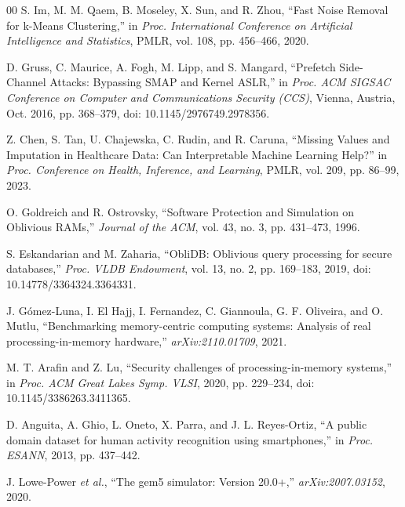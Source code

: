 \documentclass[conference]{IEEEtran}
\begin{document}
\begin{thebibliography}{00}
 S. Im, M. M. Qaem, B. Moseley, X. Sun, and R. Zhou, ``Fast Noise Removal for k-Means Clustering,'' in \textit{Proc. International Conference on Artificial Intelligence and Statistics}, PMLR, vol. 108, pp. 456--466, 2020.

 D. Gruss, C. Maurice, A. Fogh, M. Lipp, and S. Mangard, ``Prefetch Side-Channel Attacks: Bypassing SMAP and Kernel ASLR,'' in \textit{Proc. ACM SIGSAC Conference on Computer and Communications Security (CCS)}, Vienna, Austria, Oct. 2016, pp. 368--379, doi: 10.1145/2976749.2978356.

 Z. Chen, S. Tan, U. Chajewska, C. Rudin, and R. Caruna, ``Missing Values and Imputation in Healthcare Data: Can Interpretable Machine Learning Help?'' in \textit{Proc. Conference on Health, Inference, and Learning}, PMLR, vol. 209, pp. 86--99, 2023.

 O. Goldreich and R. Ostrovsky, ``Software Protection and Simulation on Oblivious RAMs,'' \textit{Journal of the ACM}, vol. 43, no. 3, pp. 431--473, 1996.

 S. Eskandarian and M. Zaharia, ``ObliDB: Oblivious query processing for secure databases,'' \textit{Proc. VLDB Endowment}, vol. 13, no. 2, pp. 169--183, 2019, doi: 10.14778/3364324.3364331.

 J. G\'omez-Luna, I. El Hajj, I. Fernandez, C. Giannoula, G. F. Oliveira, and O. Mutlu, ``Benchmarking memory-centric computing systems: Analysis of real processing-in-memory hardware,'' \textit{arXiv:2110.01709}, 2021.

 M. T. Arafin and Z. Lu, ``Security challenges of processing-in-memory systems,'' in \textit{Proc. ACM Great Lakes Symp. VLSI}, 2020, pp. 229--234, doi: 10.1145/3386263.3411365.

 D. Anguita, A. Ghio, L. Oneto, X. Parra, and J. L. Reyes-Ortiz, ``A public domain dataset for human activity recognition using smartphones,'' in \textit{Proc. ESANN}, 2013, pp. 437--442.

 J. Lowe-Power \emph{et al.}, ``The gem5 simulator: Version 20.0+,'' \emph{arXiv:2007.03152}, 2020.

\end{thebibliography}
\end{document}
